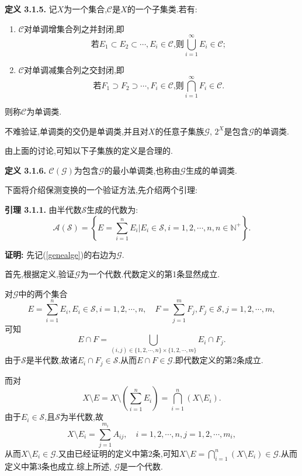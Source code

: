 \par
\textbf{定义 3.1.5.  }
记$X$为一个集合,$\mathcal{C}$是$X$的一个子集类.若有:
\begin{enumerate}
    \item $\mathcal{C}$对单调增集合列之并封闭,即
    $$\text{若}E_{1}\subset E_{2}\subset\cdots,E_{i}\in{\mathcal C}\text{,则}\bigcup_{i=1}^{\infty}E_{i}\in{\mathcal C};$$
    \item $\mathcal{C}$对单调减集合列之交封闭,即
    $$\text{若}F_{1}\supset F_{2}\supset\cdots,F_{i}\in{\mathcal C}\text{,则}\bigcap_{i=1}^{\infty}F_{i}\in{\mathcal C}.$$
\end{enumerate}
则称$\mathcal{C}$为单调类.
\par
不难验证,单调类的交仍是单调类,并且对$X$的任意子集族$\mathcal{G}$, $2^X$是包含$\mathcal{G}$的单调类.\par
由上面的讨论,可知以下子集族的定义是合理的.\par
\textbf{定义 3.1.6.  }$\mathcal{C}(\mathcal{G})$为包含$\mathcal{G}$的最小单调类,也称由$\mathcal{G}$生成的单调类.
\par
下面将介绍保测变换的一个验证方法,先介绍两个引理:\par
\textbf{引理 3.1.1.  }\textsuperscript{\cite{Ergodic_Sun,Ergodic_theory}}
由半代数$\mathcal{S}$生成的代数为:
\begin{equation}\label{genealge}
{\mathcal A}({\mathcal S})=\left\{E=\sum\limits_{i=1}^{n}E_{i}|E_{i}\in{\mathcal S},i=1,2,\cdots,n,n\in\mathbb{N^{+}}\right\}.
\end{equation}
\par
\textbf{证明:  }
先记(\ref{genealge})的右边为$\mathcal{G}$.\par
首先,根据定义,验证$\mathcal{G}$为一个代数.代数定义的第1条显然成立.\par
对$\mathcal{G}$中的两个集合
$$E=\sum\limits_{i=1}^{n}E_{i},E_{i}\in{\mathcal S},i=1,2,\cdots,n,\quad F=\sum\limits_{j=1}^{m}F_{j},F_{j}\in{\mathcal S},j=1,2,\cdots,m,$$
可知
$$E\cap F=\bigcup\limits_{(i,j)\in\{1,2,\cdots,n\}\times\{1,2,\cdots,m\}}E_i\cap F_j.$$
由于$\mathcal{S}$是半代数,故诸$E_i\cap F_j\in\mathcal{S}$.从而$E\cap F\in \mathcal{G}.$即代数定义的第2条成立.\par
而对
$$X\setminus E=X\setminus(\sum\limits_{i=1}^n E_i)=\bigcap\limits_{i=1}^n (X\setminus E_i).$$
由于$E_i \in \mathcal{S}$,且$\mathcal{S}$为半代数,故
$$X\setminus{E_i}=\sum\limits_{j=1}^{m_i}A_{ij},\quad i=1,2,\cdots,n,j=1,2,\cdots,m_i,$$
从而$X\setminus E_i\in \mathcal{G}$.又由已经证明的定义中第2条,可知$X\setminus E=\bigcap\limits_{i=1}^n (X\setminus E_i)\in \mathcal{G}$.从而定义中第3条也成立.综上所述, $\mathcal{G}$是一个代数.\par

